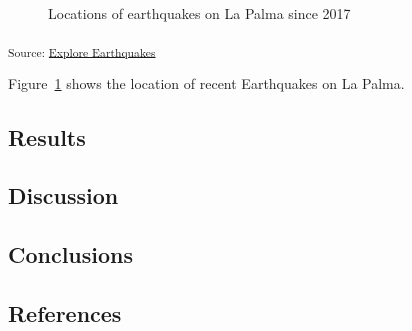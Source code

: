 \documentclass[
]{agujournal2019}
\begin{document}
\begin{figure}[H]


\caption{\label{fig-spatial-plot}Locations of earthquakes on La Palma
since 2017}

\end{figure}%

\textsubscript{Source:
\href{https://EmouAcademy.github.io/my-awesome-manuscripts/notebooks/01-earthquakes-preview.html\#c75b4191-f2f7-47d9-bf00-6d67a24e380f}{Explore
Earthquakes}}

Figure~\ref{fig-spatial-plot} shows the location of recent Earthquakes
on La Palma.

\subsection{Results}\label{sec-results}

\subsection{Discussion}\label{sec-discussion}

\subsection{Conclusions}\label{sec-conclusions}

\subsection*{References}\label{references}
\end{document}
